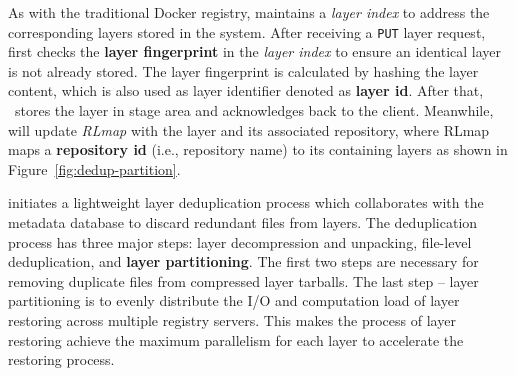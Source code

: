 As with the traditional Docker registry, 
\sysname maintains a \emph{layer index} to address the corresponding layers stored in the system.
After receiving a \texttt{PUT} layer request,
\sysname first checks the \textbf{layer fingerprint} in the \emph{layer index} to ensure 
an identical layer is not already stored.
The layer fingerprint is calculated by hashing the layer content, which is also used as layer identifier denoted as \textbf{layer id}.
After that, \sysname~stores the layer in stage area and acknowledges back to the client. 
Meanwhile, \sysname will update \emph{RLmap} with the layer and its associated repository, where
RLmap maps a \textbf{repository id} (i.e., repository name) to its containing layers 
as shown in Figure~\ref{fig:dedup-partition}.
 
 \sysname initiates a lightweight layer deduplication process which collaborates with the metadata database
 to discard redundant files from layers. 
The deduplication process has three major steps: 
layer decompression and unpacking, 
file-level deduplication,
and \textbf{layer partitioning}. 
The first two steps are necessary for removing duplicate files from compressed layer tarballs.
The last step -- layer partitioning is to evenly distribute the I/O and computation load of layer restoring across multiple registry servers.   
This makes the process of layer restoring achieve the maximum parallelism for each layer to accelerate the restoring process. 


%
